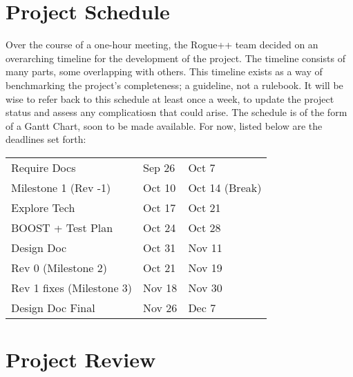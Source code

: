 \documentclass{article}
\begin{document}
\section{Project Schedule}

Over the course of a one-hour meeting, the Rogue++ team decided on an overarching timeline for the development of the project. The timeline consists of many parts, some overlapping with others. This timeline exists as a way of benchmarking the project's completeness; a guideline, not a rulebook. It will be wise to refer back to this schedule at least once a week, to update the project status and assess any complicatiosn that could arise. The schedule is of the form of a Gantt Chart, soon to be made available. For now, listed below are the deadlines set forth:

\bigskip

\begin{tabular}{lll}
	Require Docs				&	Sep 26	&	Oct 7\\
	Milestone 1	(Rev -1)		&	Oct 10	&	Oct 14 (Break)\\
	Explore Tech				&	Oct 17	&	Oct 21\\
	BOOST + Test Plan			&	Oct 24	&	Oct 28\\
	Design Doc 					&	Oct 31	&	Nov 11\\
	Rev 0 (Milestone 2)			&	Oct 21	&	Nov 19\\
	Rev 1 fixes	(Milestone 3)	&	Nov 18	&	Nov 30\\
	Design Doc Final			&	Nov 26	&	Dec 7
\end{tabular}

\section{Project Review}
\end{document}
